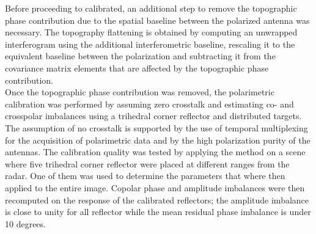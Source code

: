 Before proceeding to calibrated, an additional step to remove the topographic phase contribution due to the spatial baseline between the polarized antenna was necessary. The topography flattening is obtained by computing an unwrapped  interferogram using the additional interferometric baseline, rescaling it to the equivalent baseline between the polarization and subtracting it from the covariance matrix elements that are affected by the topographic phase contribution.\\ Once the topographic phase contribution was removed, the polarimetric calibration was performed by assuming zero crosstalk and estimating co- and crosspolar imbalances using a trihedral corner reflector and distributed targets. The assumption of no crosstalk is supported by the use of temporal multiplexing for the acquisition of polarimetric data and by the high polarization purity of the antennas. The calibration quality was tested by applying the method on a scene where five trihedral corner reflector were placed at different ranges from the radar. One of them was used to determine the parameters that where then applied to the entire image. Copolar phase and amplitude imbalances were then recomputed on the response of the calibrated reflectors; the amplitude imbalance is close to unity for all reflector while the mean residual phase imbalance is under 10 degrees.